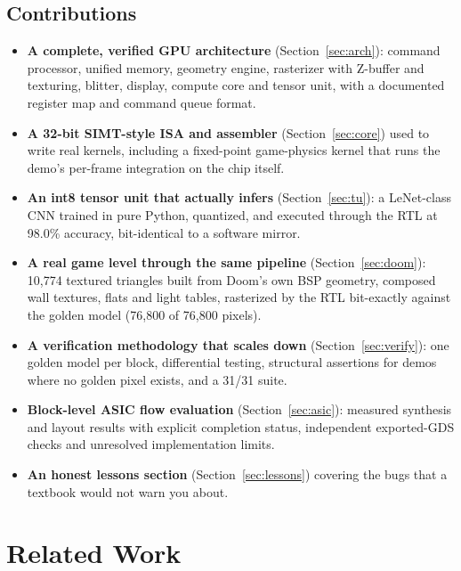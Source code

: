 \documentclass[conference]{IEEEtran}
\begin{document}
\subsection*{Contributions}
\begin{itemize}
  \item \textbf{A complete, verified GPU architecture} (Section~\ref{sec:arch}):
        command processor, unified memory, geometry engine, rasterizer with
        Z-buffer and texturing, blitter, display, compute core and tensor unit,
        with a documented register map and command queue format.
  \item \textbf{A 32-bit SIMT-style ISA and assembler} (Section~\ref{sec:core})
        used to write real kernels, including a fixed-point game-physics kernel
        that runs the demo's per-frame integration on the chip itself.
  \item \textbf{An int8 tensor unit that actually infers} (Section~\ref{sec:tu}):
        a LeNet-class CNN trained in pure Python, quantized, and executed
        through the RTL at 98.0\% accuracy, bit-identical to a software mirror.
  \item \textbf{A real game level through the same pipeline} (Section~\ref{sec:doom}):
        10{,}774 textured triangles built from Doom's own BSP geometry, composed
        wall textures, flats and light tables, rasterized by the RTL
        bit-exactly against the golden model (76{,}800 of 76{,}800 pixels).
  \item \textbf{A verification methodology that scales down} (Section~\ref{sec:verify}):
        one golden model per block, differential testing, structural assertions
        for demos where no golden pixel exists, and a 31/31 suite.
  \item \textbf{Block-level ASIC flow evaluation} (Section~\ref{sec:asic}):
        measured synthesis and layout results with explicit completion status,
        independent exported-GDS checks and unresolved implementation limits.
  \item \textbf{An honest lessons section} (Section~\ref{sec:lessons}) covering
        the bugs that a textbook would not warn you about.
\end{itemize}

\section{Related Work}
\label{sec:related}
\end{document}
